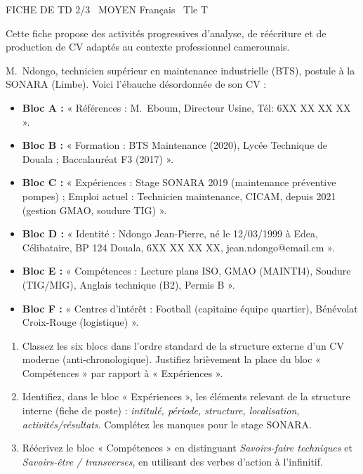 \documentclass[11pt]{article}
\begin{document}
\begin{tcolorbox}[enhanced,colback=popink,colframe=popink,arc=10pt,boxrule=0pt,left=12pt,right=12pt,top=9pt,bottom=9pt]
{\color{white}\popxbold\small FICHE DE TD 2/3 \textbullet\ MOYEN \hfill Français \textbullet\ Tle T\par}
\end{tcolorbox}
\vspace{4pt}
Cette fiche propose des activités progressives d'analyse, de réécriture et de production de CV adaptés au contexte professionnel camerounais.

\begin{exercice}
M.~Ndongo, technicien supérieur en maintenance industrielle (BTS), postule à la SONARA (Limbe). Voici l'ébauche désordonnée de son CV : 
\begin{itemize}
    \item \textbf{Bloc A :} « Références : M.~Eboum, Directeur Usine, Tél: 6XX XX XX XX ».
    \item \textbf{Bloc B :} « Formation : BTS Maintenance (2020), Lycée Technique de Douala ; Baccalauréat F3 (2017) ».
    \item \textbf{Bloc C :} « Expériences : Stage SONARA 2019 (maintenance préventive pompes) ; Emploi actuel : Technicien maintenance, CICAM, depuis 2021 (gestion GMAO, soudure TIG) ».
    \item \textbf{Bloc D :} « Identité : Ndongo Jean-Pierre, né le 12/03/1999 à Edea, Célibataire, BP 124 Douala, 6XX XX XX XX, jean.ndongo@email.cm ».
    \item \textbf{Bloc E :} « Compétences : Lecture plans ISO, GMAO (MAINTI4), Soudure (TIG/MIG), Anglais technique (B2), Permis B ».
    \item \textbf{Bloc F :} « Centres d'intérêt : Football (capitaine équipe quartier), Bénévolat Croix-Rouge (logistique) ».
\end{itemize}
\begin{enumerate}
    \item Classez les six blocs dans l'ordre standard de la structure externe d'un CV moderne (anti-chronologique). Justifiez brièvement la place du bloc « Compétences » par rapport à « Expériences ».
    \item Identifiez, dans le bloc « Expériences », les éléments relevant de la structure interne (fiche de poste) : \textit{intitulé, période, structure, localisation, activités/résultats}. Complétez les manques pour le stage SONARA.
    \item Réécrivez le bloc « Compétences » en distinguant \textit{Savoirs-faire techniques} et \textit{Savoirs-être / transverses}, en utilisant des verbes d'action à l'infinitif.
\end{enumerate}
\end{exercice}
\end{document}
